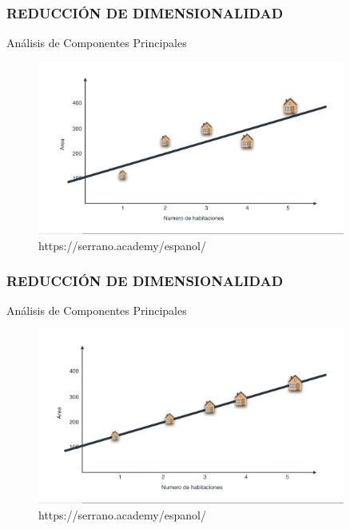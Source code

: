 \documentclass{beamer}
\begin{document}
\begin{frame}
	\frametitle{REDUCCIÓN DE DIMENSIONALIDAD}
	\begin{block}{Análisis de Componentes Principales}	
		\begin{figure}
			\includegraphics[width=0.9\textwidth]{PCA/IMG_3538.jpg}
			\caption{https://serrano.academy/espanol/}
		\end{figure}
	\end{block}
\end{frame}

\begin{frame}
	\frametitle{REDUCCIÓN DE DIMENSIONALIDAD}
	\begin{block}{Análisis de Componentes Principales}	
		\begin{figure}
			\includegraphics[width=0.9\textwidth]{PCA/IMG_3539.jpg}
			\caption{https://serrano.academy/espanol/}
		\end{figure}
	\end{block}
\end{frame}
\end{document}
